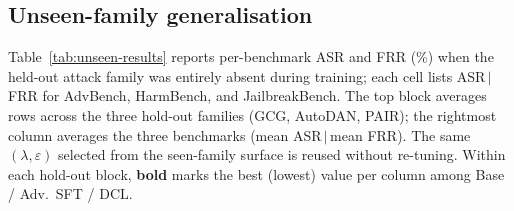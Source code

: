 \documentclass{article}
\begin{document}


\subsection{Unseen-family generalisation}
\label{sec:results-unseen}

Table~\ref{tab:unseen-results} reports per-benchmark ASR and FRR (\%) when the held-out attack family was entirely absent during training; each cell lists ASR$\,|\,$FRR for AdvBench, HarmBench, and JailbreakBench. The top block averages rows across the three hold-out families (GCG, AutoDAN, PAIR); the rightmost column averages the three benchmarks (mean ASR$\,|\,$mean FRR). The same $(\lambda,\varepsilon)$ selected from the seen-family surface is reused without re-tuning. Within each hold-out block, \textbf{bold} marks the best (lowest) value per column among Base / Adv.\ SFT / DCL.
\end{document}
